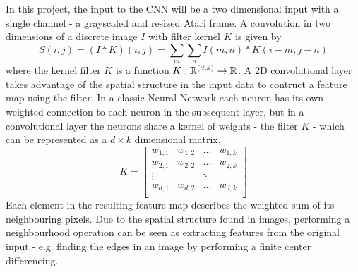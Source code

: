 \documentclass[11pt]{article}
\begin{document}
In this project, the input to the CNN will be a two dimensional input with a single
channel - a grayscaled and resized Atari frame.
A convolution in two dimensions of a discrete image $I$ with filter kernel $K$
is given by 
\begin{equation}
    S(i, j) = (I \ast K)(i, j) = \sum\limits_m \sum\limits_n I(m, n) * K(i - m, j - n)
\end{equation}
where the kernel filter $K$ is a function $K : \mathbb{R}^{(d, k)} \to \mathbb{R}$.
A 2D convolutional layer takes advantage of the spatial structure in the input data to contruct a feature map
using the filter.
In a classic Neural Network each neuron has its own weighted connection to each neuron in the subsequent layer,
but in a convolutional layer the neurons share a kernel of weights - the filter $K$ -  which can be represented as
a $d \times k$ dimensional matrix.
$$
K =
\begin{bmatrix}
    w_{1,1 } & w_{1, 2} & \hdots & w_{1, k} \\
    w_{2,1 } & w_{2, 2} & \hdots & w_{2, k} \\
    \vdots   &          & \ddots &          \\
    w_{d,1 } & w_{d, 2} & \hdots & w_{d, k} \\
\end{bmatrix}
$$
Each element in the resulting feature map describes the weighted sum of its neighbouring
pixels.
Due to the spatial structure found in images, performing a neighbourhood operation
can be seen as extracting features from the original input - e.g. finding the
edges in an image by performing a finite center differencing.
\end{document}
